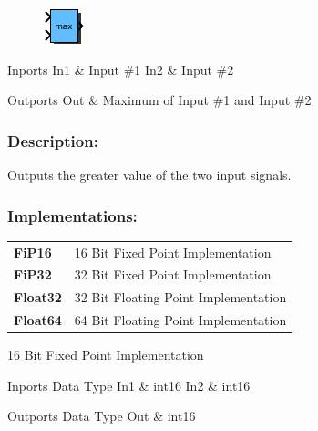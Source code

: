 \label{block:Maximum}
\begin{figure}[H]\includegraphics{Maximum}\end{figure} 

\begin{XtoCtabular}{Inports}
In1 & Input \#1\tabularnewline
\hline
In2 & Input \#2\tabularnewline
\hline
\end{XtoCtabular}


\begin{XtoCtabular}{Outports}
Out & Maximum of Input \#1 and Input \#2\tabularnewline
\hline
\end{XtoCtabular}

\subsubsection*{Description:}
Outputs the greater value of the two input signals.


\subsubsection*{Implementations:}
\begin{tabular}{l l}
\textbf{FiP16} & 16 Bit Fixed Point Implementation\tabularnewline
\textbf{FiP32} & 32 Bit Fixed Point Implementation\tabularnewline
\textbf{Float32} & 32 Bit Floating Point Implementation\tabularnewline
\textbf{Float64} & 64 Bit Floating Point Implementation\tabularnewline
\end{tabular}

\nopagebreak[0]

16 Bit Fixed Point Implementation

\begin{XtoCtabular}{Inports Data Type}
In1 & int16\tabularnewline
\hline
In2 & int16\tabularnewline
\hline
\end{XtoCtabular}

\begin{XtoCtabular}{Outports Data Type}
Out & int16\tabularnewline
\hline
\end{XtoCtabular}

\ifdefined \AddTestReports
{}
\fi
{}
\nopagebreak[0]

